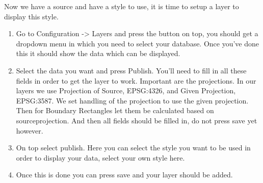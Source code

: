 Now we have a source and have a style to use, it is time to setup a layer to display this style. 
\begin{enumerate}
	\item Go to Configuration -> Layers and press the button on top, you should get a dropdown menu in which you need to select your database. Once you've done this it should show the data which can be displayed. 
	\item Select the data you want and press Publish. You'll need to fill in all these fields in order to get the layer to work. Important are the projections. In our layers we use Projection of Source, EPSG:4326, and Given Projection, EPSG:3587. We set handling of the projection to use the given projection. Then for Boundary Rectangles let them be calculated based on sourceprojection. And then all fields should be filled in, do not press save yet however. 
	\item On top select publish. Here you can select the style you want to be used in order to display your data, select your own style here. \item Once this is done you can press save and your layer should be added.
\end{enumerate}
